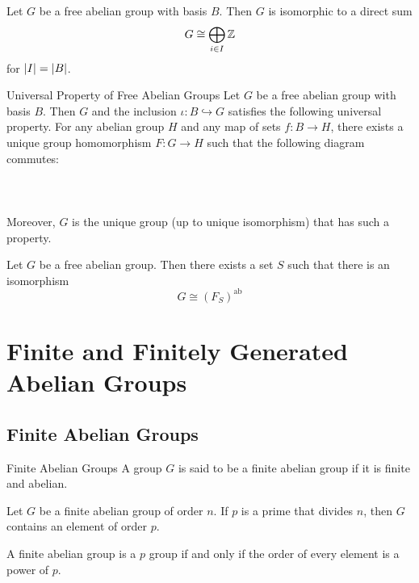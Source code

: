 \documentclass[a4paper]{article}
\begin{document}
\begin{prp}{}{} Let $G$ be a free abelian group with basis $B$. Then $G$ is isomorphic to a direct sum $$G\cong\bigoplus_{i\in I}\mathbb{Z}$$ for $\abs{I}=\abs{B}$. 
\end{prp}

\begin{prp}{Universal Property of Free Abelian Groups}{} Let $G$ be a free abelian group with basis $B$. Then $G$ and the inclusion $\iota:B\hookrightarrow G$ satisfies the following universal property. For any abelian group $H$ and any map of sets $f:B\to H$, there exists a unique group homomorphism $F:G\to H$ such that the following diagram commutes: \\~\\
 \\~\\
Moreover, $G$ is the unique group (up to unique isomorphism) that has such a property. 
\end{prp}

\begin{prp}{}{} Let $G$ be a free abelian group. Then there exists a set $S$ such that there is an isomorphism $$G\cong(F_S)^\text{ab}$$
\end{prp}

\pagebreak
\section{Finite and Finitely Generated Abelian Groups}
\subsection{Finite Abelian Groups}
\begin{defn}{Finite Abelian Groups}{} A group $G$ is said to be a finite abelian group if it is finite and abelian. 
\end{defn}

\begin{lmm}{}{} Let $G$ be a finite abelian group of order $n$. If $p$ is a prime that divides $n$, then $G$ contains an element of order $p$. 
\end{lmm}

\begin{lmm}{}{} A finite abelian group is a $p$ group if and only if the order of every element is a power of $p$. 
\end{lmm}
\end{document}

